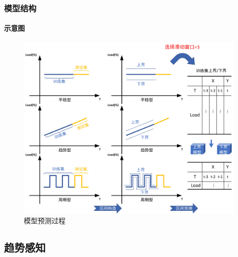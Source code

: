\begin{frame}
\frametitle{模型结构}
\framesubtitle{示意图}
\begin{figure}[htb]
\centering
\includegraphics[scale=0.45]{figures/fig7_predict_process.jpg}
\caption{模型预测过程}
\label{fig:fig7}
\end{figure}
\end{frame}

\subsection{趋势感知}


